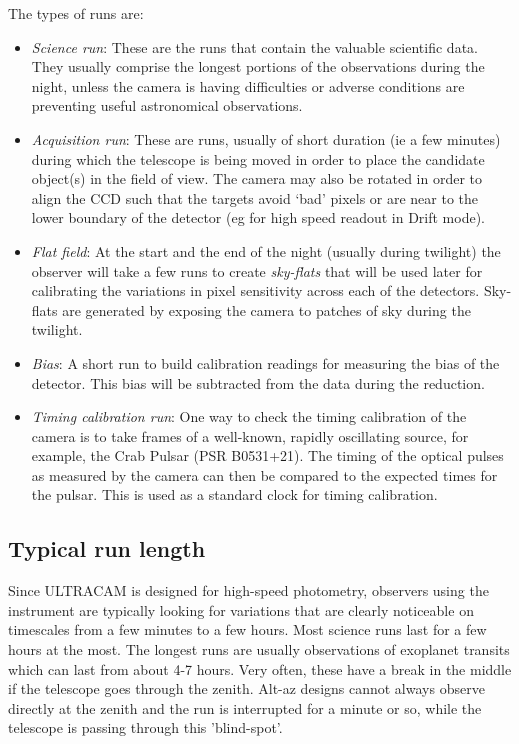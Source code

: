 The types of runs are: 
\begin{itemize}
	\item \emph{Science run}: These are the runs that contain the valuable scientific data. They usually comprise the longest portions of the observations during the night, unless the camera is having difficulties or adverse conditions are preventing useful astronomical observations.
	\item \emph{Acquisition run}: These are runs, usually of short duration (ie a few minutes) during which the telescope is being moved in order to place the candidate object(s) in the field of view. The camera may also be rotated in order to align the CCD such that the targets avoid `bad' pixels or are near to the lower boundary of the detector (eg for high speed readout in Drift mode). 
	\item \emph{Flat field}: At the start and the end of the night (usually during twilight) the observer will take a few runs to create \emph{sky-flats} that will be used later for calibrating the variations in pixel sensitivity across each of the detectors.  Sky-flats are generated by exposing the camera to patches of sky during the twilight. 
	\item \emph{Bias}: A short run to build calibration readings for measuring the bias of the detector. This bias will be subtracted from the data during the reduction. 
	\item \emph{Timing calibration run}: One way to check the timing calibration of the camera is to take frames of a well-known, rapidly oscillating source, for example, the Crab Pulsar (PSR B0531+21). The timing of the optical pulses as measured by the camera can then be compared to the expected times for the pulsar. This is used as a standard clock for timing calibration.
\end{itemize}

\subsection{Typical run length}
Since ULTRACAM is designed for high-speed photometry, observers using the instrument are typically looking for variations that are clearly noticeable on timescales from a few minutes to a few hours. Most science runs last for a few hours at the most. The longest runs are usually observations of exoplanet transits which can last from about 4-7 hours. Very often, these have a break in the middle if the telescope goes through the zenith. Alt-az designs cannot always observe directly at the zenith and the run is interrupted for a minute or so, while the telescope is passing through this 'blind-spot'.

